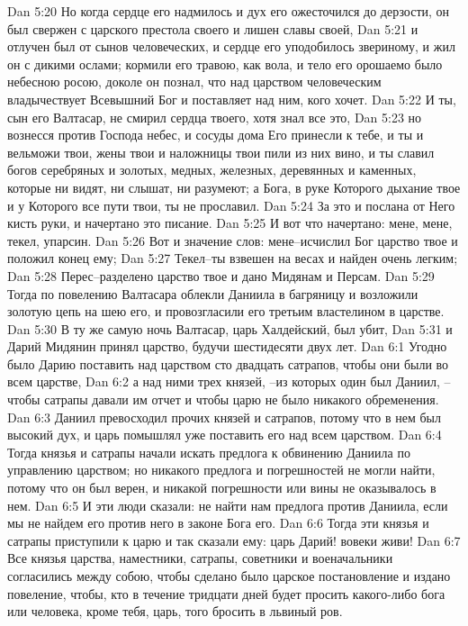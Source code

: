 Dan 5:20  Но когда сердце его надмилось и дух его ожесточился до дерзости, он был свержен с царского престола своего и лишен славы своей,
Dan 5:21  и отлучен был от сынов человеческих, и сердце его уподобилось звериному, и жил он с дикими ослами; кормили его травою, как вола, и тело его орошаемо было небесною росою, доколе он познал, что над царством человеческим владычествует Всевышний Бог и поставляет над ним, кого хочет.
Dan 5:22  И ты, сын его Валтасар, не смирил сердца твоего, хотя знал все это,
Dan 5:23  но вознесся против Господа небес, и сосуды дома Его принесли к тебе, и ты и вельможи твои, жены твои и наложницы твои пили из них вино, и ты славил богов серебряных и золотых, медных, железных, деревянных и каменных, которые ни видят, ни слышат, ни разумеют; а Бога, в руке Которого дыхание твое и у Которого все пути твои, ты не прославил.
Dan 5:24  За это и послана от Него кисть руки, и начертано это писание.
Dan 5:25  И вот что начертано: мене, мене, текел, упарсин.
Dan 5:26  Вот и значение слов: мене--исчислил Бог царство твое и положил конец ему;
Dan 5:27  Текел--ты взвешен на весах и найден очень легким;
Dan 5:28  Перес--разделено царство твое и дано Мидянам и Персам.
Dan 5:29  Тогда по повелению Валтасара облекли Даниила в багряницу и возложили золотую цепь на шею его, и провозгласили его третьим властелином в царстве.
Dan 5:30  В ту же самую ночь Валтасар, царь Халдейский, был убит,
Dan 5:31  и Дарий Мидянин принял царство, будучи шестидесяти двух лет.
Dan 6:1  Угодно было Дарию поставить над царством сто двадцать сатрапов, чтобы они были во всем царстве,
Dan 6:2  а над ними трех князей, --из которых один был Даниил, --чтобы сатрапы давали им отчет и чтобы царю не было никакого обременения.
Dan 6:3  Даниил превосходил прочих князей и сатрапов, потому что в нем был высокий дух, и царь помышлял уже поставить его над всем царством.
Dan 6:4  Тогда князья и сатрапы начали искать предлога к обвинению Даниила по управлению царством; но никакого предлога и погрешностей не могли найти, потому что он был верен, и никакой погрешности или вины не оказывалось в нем.
Dan 6:5  И эти люди сказали: не найти нам предлога против Даниила, если мы не найдем его против него в законе Бога его.
Dan 6:6  Тогда эти князья и сатрапы приступили к царю и так сказали ему: царь Дарий! вовеки живи!
Dan 6:7  Все князья царства, наместники, сатрапы, советники и военачальники согласились между собою, чтобы сделано было царское постановление и издано повеление, чтобы, кто в течение тридцати дней будет просить какого-либо бога или человека, кроме тебя, царь, того бросить в львиный ров.
